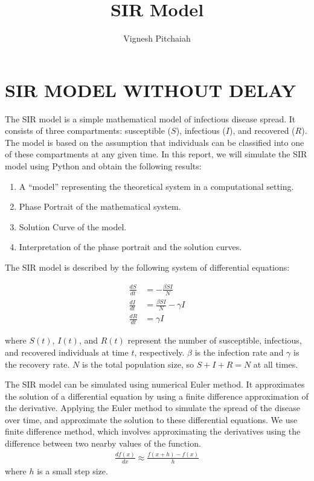 \documentclass{article}
\title{SIR Model}
\author{Vignesh Pitchaiah}
\begin{document}
\maketitle
\section{SIR MODEL WITHOUT DELAY}

The SIR model is a simple mathematical model of infectious disease spread. It consists of three compartments: susceptible ($S$), infectious ($I$), and recovered ($R$). The model is based on the assumption that individuals can be classified into one of these compartments at any given time. In this report, we will simulate the SIR model using Python and obtain the following results:

\begin{enumerate}
\item A “model” representing the theoretical system in a computational setting.
\item Phase Portrait of the mathematical system.
\item Solution Curve of the model.
\item Interpretation of the phase portrait and the solution curves.
\end{enumerate}


The SIR model is described by the following system of differential equations:

\begin{align*}
    \frac{dS}{dt} &= -\frac{\beta S I}{N} \\
    \frac{dI}{dt} &= \frac{\beta S I}{N} - \gamma I \\
    \frac{dR}{dt} &= \gamma I
\end{align*}

where $S(t)$, $I(t)$, and $R(t)$ represent the number of susceptible, infectious, and recovered individuals at time $t$, respectively. $\beta$ is the infection rate and $\gamma$ is the recovery rate. $N$ is the total population size, so $S+I+R=N$ at all times.

The SIR model can be simulated using numerical Euler method. It approximates the solution of a differential equation by using a finite difference approximation of the derivative. Applying the Euler
method to simulate the spread of the disease over time, and approximate the solution to these differential equations. We use finite difference method, which involves approximating the derivatives using the difference between two nearby values of the function. \\
\begin{align*}
\frac{df(x)}{dx} \approx \frac{f(x+h)-f(x)}{h}
\end{align*}
\hspace{1em}where $h$ is a small step size.\\
\end{document}
